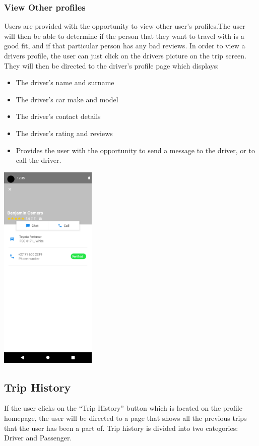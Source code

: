 \documentclass[hidelinks, 12pt, a4paper]{article}
\begin{document}
\subsubsection{View Other profiles}
Users are provided with the opportunity to view other user's profiles.The user will then be able to determine if the person that they want to travel with is a good fit, and if that particular person has any bad reviews. In order to view a drivers profile, the user can just click on the drivers picture on the trip screen. They will then be directed to the driver’s profile page which displays:
\begin{itemize}
    \item The driver’s name and surname
    \item The driver’s car make and model
    \item The driver’s contact details
    \item The driver’s rating and reviews
    \item 	Provides the user with the opportunity to send a message to the driver, or to call the driver.
\end{itemize}
\begin{center}
  \includegraphics[height=10cm]{images/viewDriver.png}
\end{center}
\vspace{1cm}

\subsection{Trip History}
If the user clicks on the “Trip History” button which is located on the profile homepage, the user will be directed to a page that shows all the previous trips that the user has been a part of. Trip history is divided into two categories: Driver and Passenger. 
\end{document}

